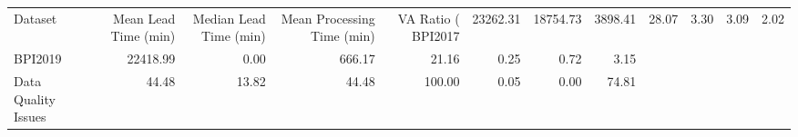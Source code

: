 \begin{tabular}{lrrrrrrr}
\toprule
Dataset & Mean Lead Time (min) & Median Lead Time (min) & Mean Processing Time (min) & VA Ratio (%
\midrule
BPI2017 & 23262.31 & 18754.73 & 3898.41 & 28.07 & 3.30 & 3.09 & 2.02 \\
BPI2019 & 22418.99 & 0.00 & 666.17 & 21.16 & 0.25 & 0.72 & 3.15 \\
Data Quality Issues & 44.48 & 13.82 & 44.48 & 100.00 & 0.05 & 0.00 & 74.81 \\
\bottomrule
\end{tabular}
